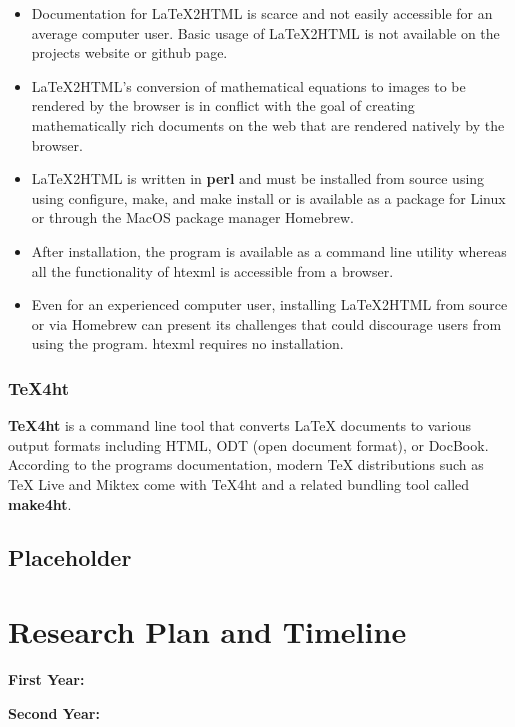 \documentclass[11pt]{article}
\begin{document}
\begin{itemize}
\item Documentation for LaTeX2HTML is scarce and not easily accessible for an average computer user.  Basic usage of LaTeX2HTML is not available on the projects website or github page.
\item LaTeX2HTML's conversion of mathematical equations to images to be rendered by the browser is in conflict with the goal of creating mathematically rich documents on the web that are rendered natively by the browser.
\item LaTeX2HTML is written in \textbf{perl} and must be installed from source using using configure, make, and make install or is available as a package for Linux or through the MacOS package manager Homebrew.
\item After installation, the program is available as a command line utility whereas all the functionality of htexml is accessible from a browser.
\item Even for an experienced computer user, installing LaTeX2HTML from source or via Homebrew can present its challenges that could discourage users from using the program.  htexml requires no installation.
\end{itemize}

\subsubsection{TeX4ht}
\textbf{TeX4ht} is a command line tool that converts LaTeX documents to various output formats including HTML, ODT (open document format), or DocBook.  According to the programs documentation, modern TeX distributions such as TeX Live and Miktex come with TeX4ht and a related bundling tool called \textbf{make4ht}.  



\subsection{Placeholder}


\section{Research Plan and Timeline}


\noindent\textbf{First Year:}  

\noindent\textbf{Second Year:}  
\end{document}
